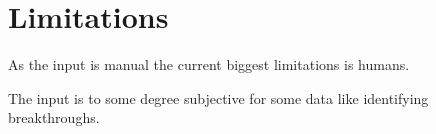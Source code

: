 \section{Limitations}

As the input is manual the current biggest limitations is humans. 

The input is to some degree subjective for some data like identifying breakthroughs.